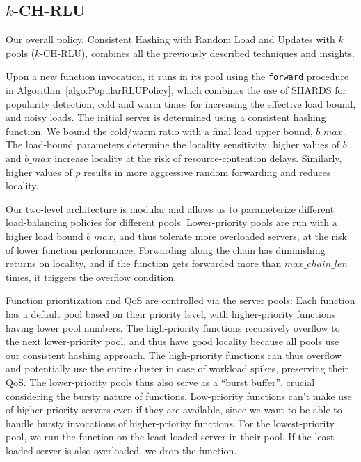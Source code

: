 \subsection{$k$-CH-RLU}
\label{subsec:kchrlu}

Our overall policy, Consistent Hashing with Random Load and Updates with $k$ pools ($k$-CH-RLU), combines all the previously described techniques and insights.

Upon a new function invocation, it runs in its pool using the \texttt{forward} procedure in Algorithm~\ref{algo:PopularRLUPolicy}, which combines the use of SHARDS for popularity detection, cold and warm times for increasing the effective load bound, and noisy loads. 
The initial server is determined using a consistent hashing function. 
We bound the cold/warm ratio with a final load upper bound, $b\_max$.
The load-bound parameters determine the locality sensitivity: higher values of $b$ and $b\_max$ increase locality at the risk of resource-contention delays.
Similarly, higher values of $p$ results in more aggressive random forwarding and reduces locality. 

Our two-level architecture is modular and allows us to parameterize different load-balancing policies for different pools.
Lower-priority pools are run with a higher load bound $b\_max$, and thus tolerate more overloaded servers, at the risk of lower function performance.
Forwarding along the chain has diminishing returns on locality, and if the function gets forwarded more than $max\_chain\_len$ times, it triggers the overflow condition.

Function prioritization and QoS are controlled via the server pools: Each function has a default pool based on their priority level, with higher-priority functions having lower pool numbers. 
The high-priority functions recursively overflow to the next lower-priority pool, and thus have good locality because all pools use our consistent hashing approach. 
The high-priority functions can thus overflow and potentially use the entire cluster in case of workload spikes, preserving their QoS. 
The lower-priority pools thus also serve as a ``burst buffer'', crucial considering the bursty nature of functions. 
Low-priority functions can't make use of higher-priority servers even if they are available, since we want to be able to handle bursty invocations of higher-priority functions. 
For the lowest-priority pool, we run the function on the least-loaded server in their pool. 
%
If the least loaded server is also overloaded, we drop the function.

